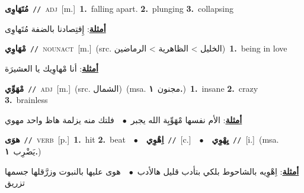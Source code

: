 \documentclass[10pt,a4paper,twoside]{article} %
\begin{document}
\begin{multicols}{2}
{\setlength\topsep{0pt}\textbf{\foreignlanguage{arabic}{مُتَهَاوِى}}\ {\color{gray}\texttt{//}\color{black}}\ \textsc{adj}\ [m.]\ \textbf{1.}~falling apart.  \textbf{2.}~plunging  \textbf{3.}~collapsing\  \begin{flushright}\color{gray}\foreignlanguage{arabic}{\textbf{\underline{\foreignlanguage{arabic}{أمثلة}}}: إِقتِصادنا بالضفة مُتَهاوِى}\end{flushright}\color{black}} \vspace{2mm}

{\setlength\topsep{0pt}\textbf{\foreignlanguage{arabic}{مْهَاوِي}}\ {\color{gray}\texttt{//}\color{black}}\ \textsc{noun\textunderscore act}\ [m.]\ (src. \color{gray}\foreignlanguage{arabic}{الخليل > الظاهرية > الرماضين}\color{black})\ \textbf{1.}~being in love\  \begin{flushright}\color{gray}\foreignlanguage{arabic}{\textbf{\underline{\foreignlanguage{arabic}{أمثلة}}}: أنا مْهاوِيك يا العشيرَة}\end{flushright}\color{black}} \vspace{2mm}

{\setlength\topsep{0pt}\textbf{\foreignlanguage{arabic}{مْهَوِّي}}\ {\color{gray}\texttt{//}\color{black}}\ \textsc{adj}\ [m.]\ (src. \color{gray}\foreignlanguage{arabic}{الشمال}\color{black})\ \color{gray}(msa. \foreignlanguage{arabic}{مجنون}~\foreignlanguage{arabic}{\textbf{١.}})\color{black}\ \textbf{1.}~insane  \textbf{2.}~crazy  \textbf{3.}~brainless\  \begin{flushright}\color{gray}\foreignlanguage{arabic}{\textbf{\underline{\foreignlanguage{arabic}{أمثلة}}}: الأم نفسها مْهَوِّيِة الله يجبر\ $\bullet$\ \  فلتك منه يزلمة هاظ واحد مهوي}\end{flushright}\color{black}} \vspace{2mm}

{\setlength\topsep{0pt}\textbf{\foreignlanguage{arabic}{هوَى}}\ {\color{gray}\texttt{//}\color{black}}\ \textsc{verb}\ [p.]\ \textbf{1.}~hit  \textbf{2.}~beat\ \ $\bullet$\ \ \setlength\topsep{0pt}\textbf{\foreignlanguage{arabic}{اِهْوِي}}\ {\color{gray}\texttt{//}\color{black}}\ [c.]\ \ $\bullet$\ \ \setlength\topsep{0pt}\textbf{\foreignlanguage{arabic}{يِهْوِي}}\ {\color{gray}\texttt{//}\color{black}}\ [i.]\ \color{gray}(msa. \foreignlanguage{arabic}{يَضْرِب}~\foreignlanguage{arabic}{\textbf{١.}})\color{black}\  \begin{flushright}\color{gray}\foreignlanguage{arabic}{\textbf{\underline{\foreignlanguage{arabic}{أمثلة}}}: اِهْوِيه بالشاحوط بلكي بتأدب قليل هالأدب\ $\bullet$\ \  هوى عليها بالنبوت وزرَّقلها جسمها تزريق}\end{flushright}\color{black}} \vspace{2mm}


\end{multicols}
\end{document}
